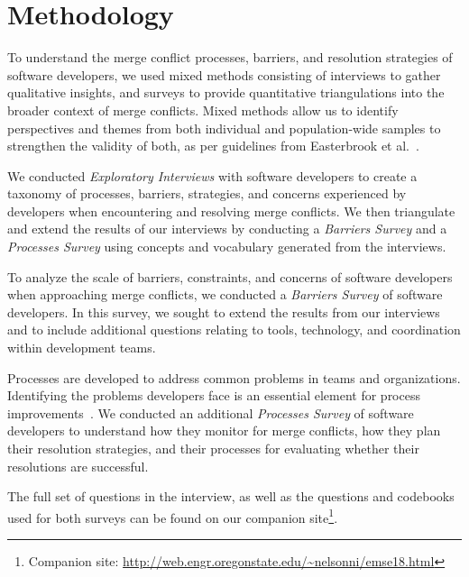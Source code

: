 
\section{Methodology}\label{methodology}


To understand the merge conflict processes, barriers, and resolution strategies of software developers, we used mixed methods consisting of interviews to gather qualitative insights, and surveys to provide quantitative triangulations into the broader context of merge conflicts.
Mixed methods allow us to identify perspectives and themes from both individual and population-wide samples to strengthen the validity of both, as per guidelines from Easterbrook et al.~\cite{easterbrook2008selecting}.

We conducted \textit{Exploratory Interviews} with software developers to create a taxonomy of processes, barriers, strategies, and concerns experienced by developers when encountering and resolving merge conflicts.
We then triangulate and extend the results of our interviews by conducting a \textit{Barriers Survey} and a \textit{Processes Survey} using concepts and vocabulary generated from the interviews.

To analyze the scale of barriers, constraints, and concerns of software developers when approaching merge conflicts, we conducted a \textit{Barriers Survey} of software developers.
In this survey, we sought to extend the results from our interviews and to include additional questions relating to tools, technology, and coordination within development teams.

Processes are developed to address common problems in teams and organizations.
Identifying the problems developers face is an essential element for process improvements~\cite{beecham2003software}.
We conducted an additional \textit{Processes Survey} of software developers to understand how they monitor for merge conflicts, how they plan their resolution strategies, and their processes for evaluating whether their resolutions are successful.

The full set of questions in the interview, as well as the questions and codebooks used for both surveys can be found on our companion site\footnote{Companion site: \url{http://web.engr.oregonstate.edu/~nelsonni/emse18.html}}.

